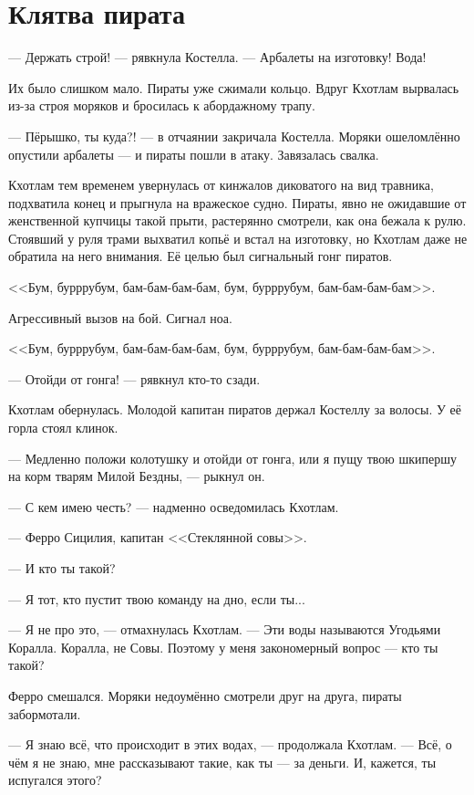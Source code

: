 \section{Клятва пирата}

--- Держать строй! --- рявкнула Костелла.
--- Арбалеты на изготовку!
Вода!

Их было слишком мало.
Пираты уже сжимали кольцо.
Вдруг Кхотлам вырвалась из-за строя моряков и бросилась к абордажному трапу.

--- Пёрышко, ты куда?! --- в отчаянии закричала Костелла.
Моряки ошеломлённо опустили арбалеты --- и пираты пошли в атаку.
Завязалась свалка.

Кхотлам тем временем увернулась от кинжалов диковатого на вид травника, подхватила конец и прыгнула на вражеское судно.
Пираты, явно не ожидавшие от женственной купчицы такой прыти, растерянно смотрели, как она бежала к рулю.
Стоявший у руля трами выхватил копьё и встал на изготовку, но Кхотлам даже не обратила на него внимания.
Её целью был сигнальный гонг пиратов.

<<Бум, бурррубум, бам-бам-бам-бам, бум, бурррубум, бам-бам-бам-бам>>.

Агрессивный вызов на бой.
Сигнал ноа.

<<Бум, бурррубум, бам-бам-бам-бам, бум, бурррубум, бам-бам-бам-бам>>.

--- Отойди от гонга! --- рявкнул кто-то сзади.

Кхотлам обернулась.
Молодой капитан пиратов держал Костеллу за волосы.
У её горла стоял клинок.

--- Медленно положи колотушку и отойди от гонга, или я пущу твою шкипершу на корм тварям Милой Бездны, --- рыкнул он.

--- С кем имею честь? --- надменно осведомилась Кхотлам.

--- Ферро Сицилия, капитан <<Стеклянной совы>>.

--- И кто ты такой?

--- Я тот, кто пустит твою команду на дно, если ты...

--- Я не про это, --- отмахнулась Кхотлам.
--- Эти воды называются Угодьями Коралла.
Коралла, не Совы.
Поэтому у меня закономерный вопрос --- кто ты такой?

Ферро смешался.
Моряки недоумённо смотрели друг на друга, пираты забормотали.

--- Я знаю всё, что происходит в этих водах, --- продолжала Кхотлам.
--- Всё, о чём я не знаю, мне рассказывают такие, как ты --- за деньги.
И, кажется, ты испугался этого?

